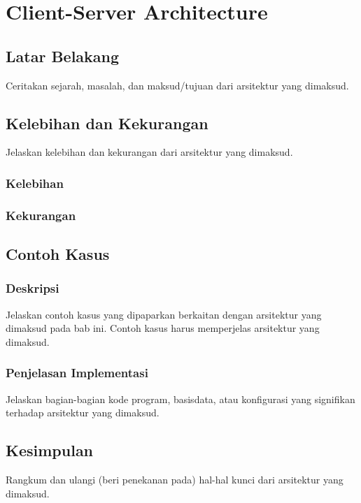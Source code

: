 \chapter{Client-Server Architecture}

\section{Latar Belakang}
Ceritakan sejarah, masalah, dan maksud/tujuan dari arsitektur yang dimaksud.

\section{Kelebihan dan Kekurangan}
Jelaskan kelebihan dan kekurangan dari arsitektur yang dimaksud.
\subsection{Kelebihan}
\subsection{Kekurangan}

\section{Contoh Kasus}

\subsection{Deskripsi}
Jelaskan contoh kasus yang dipaparkan berkaitan dengan arsitektur yang dimaksud pada bab ini.
Contoh kasus harus memperjelas arsitektur yang dimaksud.

\subsection{Penjelasan Implementasi}
Jelaskan bagian-bagian kode program, basisdata, atau konfigurasi yang signifikan terhadap arsitektur yang dimaksud.

\section{Kesimpulan}
Rangkum dan ulangi (beri penekanan pada) hal-hal kunci dari arsitektur yang dimaksud.
